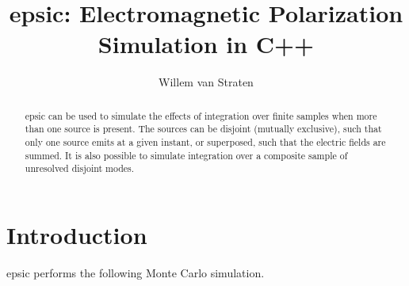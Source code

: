 \documentclass[12pt]{article}
\begin{document}
\title{ {\sc epsic}: Electromagnetic Polarization Simulation in C++ }

\author{Willem van Straten}

\maketitle

\begin{abstract}

  {\sc epsic} can be used to simulate the effects of integration over finite samples when more than one source is present. The sources can be disjoint (mutually exclusive), such that only one source emits at a given instant, or superposed, such that the electric fields are summed. It is also possible to simulate integration over a composite sample of unresolved disjoint modes.

\end{abstract}



\section {Introduction}

{\sc epsic} performs the following Monte Carlo simulation.
\end{document}
